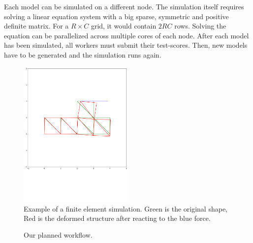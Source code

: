 \documentclass[12pt]{article}
\begin{document}
Each model can be simulated on a different node. The simulation itself requires solving a linear equation system with a big sparse, symmetric and positive definite matrix. For a $R \times C$ grid, it would contain ${2RC}$ rows. Solving the equation can be parallelized across multiple cores of each node. After each model has been simulated, all workers must submit their test-scores. Then, new models have to be generated and the simulation runs again.





\begin{figure}[p]
    \centering
    \includegraphics[width=0.5\textwidth, trim={0cm 6.5cm 0cm 0cm}, clip]{images/finiteElements.pdf}
    \caption{Example of a finite element simulation. Green is the original shape, Red is the deformed structure after reacting to the blue force.}
    \label{fig:finiteElements}
\end{figure}

\begin{figure}[p]
    \centering
    \caption{Our planned workflow.}
    \label{fig:workflow}
\end{figure}
\end{document}
